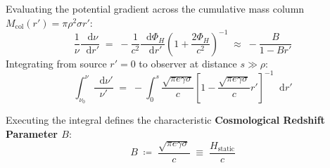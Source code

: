 \documentclass[
    12pt,
    a4paper,
    headings=normal,
    twoside=false,
    open=any,
    parskip=half
]{scrbook}
\newcommand{\diff}{\mathop{}\!\mathrm{d}}
\begin{document}
Evaluating the potential gradient across the cumulative mass column $M_{\text{col}}(r') = \pi \rho^2 \sigma r'$:
\begin{equation}
\frac{1}{\nu}\frac{\diff\nu}{\diff r'} \;=\; -\frac{1}{c^2} \frac{\diff\Phi_H}{\diff r'} \left( 1 + \frac{2\Phi_H}{c^2} \right)^{-1} \;\approx\; -\frac{B}{1 - B r'}
\label{eq:ch7_frequency_gradient_ode_expanded}
\end{equation}
Integrating from source $r' = 0$ to observer at distance $s \gg \rho$:
\begin{equation}
\int_{\nu_0}^\nu \frac{\diff\nu'}{\nu'} \;=\; -\int_0^s \frac{\sqrt{\pi e \gamma \sigma}}{c} \left[ 1 - \frac{\sqrt{\pi e \gamma \sigma}}{c} r' \right]^{-1} \diff r'
\label{eq:ch7_log_frequency_integral}
\end{equation}

Executing the integral defines the characteristic \textbf{Cosmological Redshift Parameter $B$}:
\begin{equation}
\boxed{B \;\coloneqq\; \frac{\sqrt{\pi e \gamma \sigma}}{c} \;\equiv\; \frac{H_{\text{static}}}{c}}
\label{eq:ch7_B_parameter_def}
\end{equation}
\end{document}
